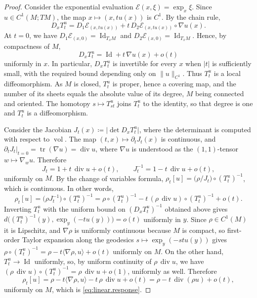 \documentclass[11pt,reqno]{amsart}
\theoremstyle{plain}
\theoremstyle{definition}
\DeclareMathOperator{\tr}{tr}
\DeclareMathOperator{\Id}{Id}
\DeclareMathOperator{\vol}{vol}
\DeclareMathOperator{\Div}{div}
\begin{document}
\begin{proof}
    Consider the exponential evaluation \(\mathcal E(x,\xi)=\exp_x\xi\). 
    Since \(u\in C^1(M;TM)\), the map \(x\mapsto (x,tu(x))\) is \(C^1\). 
    By the chain rule,
    \[
        D_xT_t^u = D_1\mathcal E_{(x,tu(x))}+ t\,D_2\mathcal E_{(x,tu(x))}\circ \nabla u(x).
    \]
    At \(t=0\), we have
    \(D_1\mathcal E_{(x,0)}=\Id_{T_xM}\) and \(D_2\mathcal E_{(x,0)}=\Id_{T_xM}\).
    Hence, by compactness of \(M\),
    \[
        D_xT_t^u=\Id+t\,\nabla u(x)+o(t)
    \]
    uniformly in \(x\).
    In particular, \(D_xT_t^u\) is invertible for every \(x\) when \(\lvert t\rvert\) is sufficiently small, with the required bound depending only on \(\lVert u\rVert_{C^1}\).
    Thus \(T_t^u\) is a local diffeomorphism.
    As \(M\) is closed, \(T_t^u\) is proper, hence a covering map, and the number of its sheets equals the absolute value of its degree, \( M \) being connected and oriented.
    The homotopy \( s\mapsto T^u_{st} \) joins \( T^u_t \) to the identity, so that degree is one and \( T^u_t \) is a diffeomorphism.


    Consider the Jacobian \(J_t(x)\coloneqq \lvert\det D_xT_t^u\rvert\), where the determinant is computed with respect to \(\vol\). 
    The map \((t,x)\mapsto\partial_tJ_t(x)\) is continuous, and \(\partial_tJ_t|_{t=0}=\tr(\nabla u)=\Div u\), where \(\nabla u\) is understood as the \((1,1)\)-tensor \(w \mapsto \nabla_w u\). 
    Therefore
    \[
        J_t=1+t\,\Div u+o(t), \qquad J_t^{-1}=1-t\,\Div u+o(t),
    \]
    uniformly on \(M\). 
    By the change of variables formula, \(\rho_t[u]=\bigl(\rho/J_t\bigr)\circ(T_t^u)^{-1}\), which is continuous.
    In other words,
    \[
        \rho_t[u]
        =\bigl(\rho J_t^{-1}\bigr)\circ(T_t^u)^{-1} =\rho\circ(T_t^u)^{-1}-t\,(\rho\,\Div u)\circ(T_t^u)^{-1}+o(t).
    \]        
    Inverting \( T^u_t \) with the uniform bound on \( (D_xT^u_t)^{-1} \) obtained above gives \( d\big((T^u_t)^{-1}(y),\exp_y(-tu(y))\big)=o(t) \) uniformly in \( y \).
    Since \( \rho\in C^1(M) \) it is Lipschitz, and \( \nabla\rho \) is uniformly continuous because \( M \) is compact, so first-order Taylor expansion along the geodesics \( s\mapsto\exp_y(-stu(y)) \) gives \( \rho\circ(T^u_t)^{-1}=\rho-t\langle\nabla\rho,u\rangle+o(t) \) uniformly on \( M \).
    On the other hand, \(T_t^u\to\Id\) uniformly, so, by uniform continuity of \(\rho\,\Div u\), we have \((\rho\,\Div u)\circ(T_t^u)^{-1}=\rho\,\Div u+o(1)\), uniformly as well.
    Therefore
    \[
        \rho_t[u]=\rho-t\langle\nabla\rho,u\rangle-t\,\rho\,\Div u+o(t)=\rho-t\,\Div(\rho u)+o(t),
    \]
    uniformly on \(M\), which is \eqref{eq:linear.response}.


\end{proof}
\end{document}
